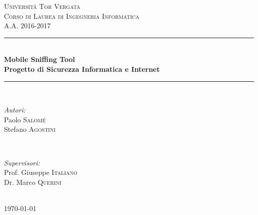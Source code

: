 \documentclass[12pt]{article} %
\begin{document}

\begin{titlepage}

\newcommand{\HRule}{\rule{\linewidth}{0.5mm}} %

\center %

\textsc{\LARGE Universit\'a Tor Vergata}\\[1.5cm] %
\textsc{\Large Corso di Laurea di Ingegneria Informatica}\\[0.5cm] %
\textsc{\large A.A. 2016-2017}\\[0.5cm] %

\HRule \\[0.4cm]
{ \huge \bfseries Mobile Sniffing Tool}\\[0.4cm] %
{ \bfseries Progetto di Sicurezza Informatica e Internet}\\[0,4cm]
\HRule \\[1.5cm]

\begin{minipage}{0.4\textwidth}
\begin{flushleft} \large
\emph{Autori:}\\
Paolo \textsc{Salom\'e}\\
Stefano \textsc{Agostini} %
\end{flushleft}
\end{minipage}
~
\begin{minipage}{0.4\textwidth}
\begin{flushright} \large
\emph{Supervisori:}\\
Prof. Giuseppe \textsc{Italiano}\\ 
Dr. Marco \textsc{Querini}  %
\end{flushright}
\end{minipage}\\[8,5cm]

{\large \today}\\[3cm] %


\vfill %

\end{titlepage}
\end{document}
